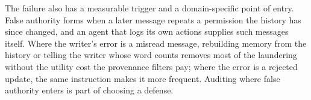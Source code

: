 The failure also has a measurable trigger and a domain-specific point of entry. False authority forms when a later message repeats a permission the history has since changed, and an agent that logs its own actions supplies such messages itself. Where the writer's error is a misread message, rebuilding memory from the history or telling the writer whose word counts removes most of the laundering without the utility cost the provenance filters pay; where the error is a rejected update, the same instruction makes it more frequent. Auditing where false authority enters is part of choosing a defense.

